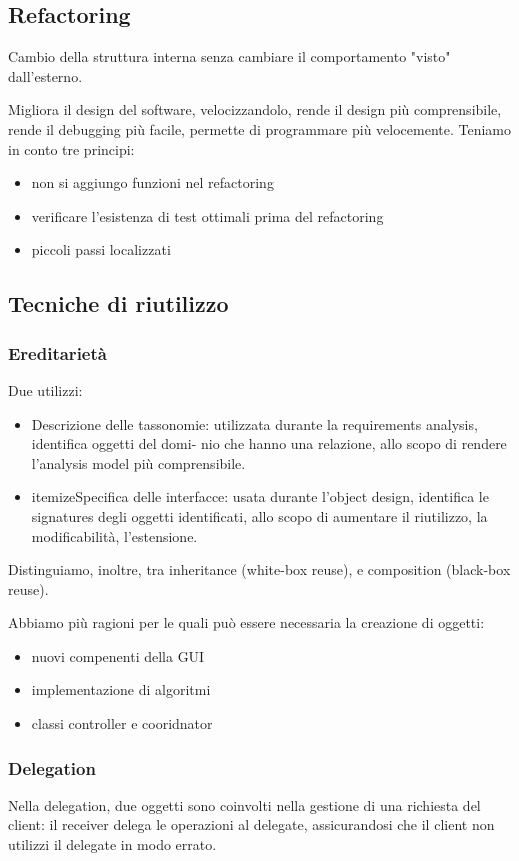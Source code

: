 \documentclass{article}
\begin{document}
\subsection{Refactoring}
Cambio della struttura interna senza cambiare il comportamento "visto" dall'esterno.

Migliora il design del software, velocizzandolo, rende il design più comprensibile, rende il debugging più facile, permette
di programmare più velocemente. Teniamo in conto tre principi:
\begin{itemize}
    \item non si aggiungo funzioni nel refactoring
    \item verificare l'esistenza di test ottimali prima del refactoring
    \item piccoli passi localizzati
\end{itemize}

\subsection{Tecniche di riutilizzo}
\subsubsection{Ereditarietà}
Due utilizzi:
\begin{itemize}
    \item Descrizione delle tassonomie: utilizzata durante la requirements analysis, identifica oggetti del domi-
    nio che hanno una relazione, allo scopo di rendere l'analysis model più comprensibile.
    \item itemizeSpecifica delle interfacce: usata durante l'object design, identifica le signatures degli oggetti identificati, allo scopo di aumentare il riutilizzo, la modificabilità, l'estensione.
\end{itemize}

Distinguiamo, inoltre, tra inheritance (white-box reuse), e composition (black-box reuse).

Abbiamo più ragioni per le quali può essere necessaria la
creazione di oggetti:
\begin{itemize}
    \item nuovi compenenti della GUI
    \item implementazione di algoritmi
    \item classi controller e cooridnator
\end{itemize}

\subsubsection{Delegation}
Nella delegation, due
oggetti sono coinvolti nella gestione di una richiesta del client: il receiver delega le operazioni al delegate,
assicurandosi che il client non utilizzi il delegate in modo errato.
\end{document}

